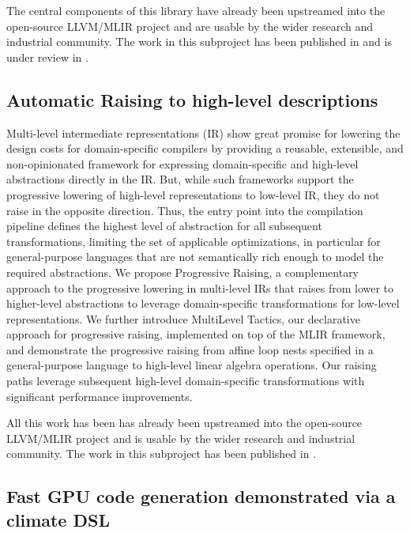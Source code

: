\documentclass[11pt, manuscript,\review anonymous]{acmart}
\begin{document}
The central components of this library have already been upstreamed into the
open-source LLVM/MLIR project and are usable by the wider research and 
industrial community. The work in this subproject has been published in \citet{grosser2020fast} and
is under review in \citet{pichanatan2021}.

\subsection{Automatic Raising to high-level descriptions}

Multi-level intermediate representations (IR) show great promise for lowering
the design costs for domain-specific compilers by providing a reusable,
extensible, and non-opinionated framework for expressing domain-specific and
high-level abstractions directly in the IR. But, while such frameworks support
the progressive lowering of high-level representations to low-level IR, they do
not raise in the opposite direction. Thus, the entry point into the compilation
pipeline defines the highest level of abstraction for all subsequent
transformations, limiting the set of applicable optimizations, in particular
for general-purpose languages that are not semantically rich enough to model
the required abstractions.  We propose Progressive Raising, a complementary
approach to the progressive lowering in multi-level IRs that raises from lower
to higher-level abstractions to leverage domain-specific transformations for
low-level representations. We further introduce MultiLevel Tactics, our
declarative approach for progressive raising, implemented on top of the MLIR
framework, and demonstrate the progressive raising from affine loop nests
specified in a general-purpose language to high-level linear algebra
operations.  Our raising paths leverage subsequent high-level domain-specific
transformations with significant performance improvements.

All this work has been has already been upstreamed into the open-source
LLVM/MLIR project and is usable by the wider research and industrial community.
The work in this subproject has been published in \citet{chelini2021mlir}.

\subsection{Fast GPU code generation demonstrated via a climate DSL}
\end{document}
